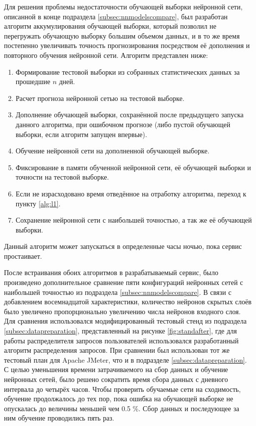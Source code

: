 \documentclass[a4paper,14pt,russian]{extreport}
\begin{document}
Для решения проблемы недостаточности обучающей выборки нейронной сети, 
описанной в конце подраздела \ref{subsec:nnmodelscompare}, был разработан 
алгоритм аккумулирования обучающей выборки, который позволил не 
перегружать обучающую выборку большим объемом данных, и в то же время 
постепенно увеличивать точность прогнозирования посредством её дополнения и 
повторного обучения нейронной сети. Алгоритм представлен ниже:
\begin{enumerate}
	\item Формирование тестовой выборки из собранных статистических 
		данных за прошедшие $n$ дней.
	\item \label{alg:l1} Расчет прогноза нейронной сетью на тестовой выборке.
	\item Дополнение обучающей выборки, сохранённой после предыдущего 
		запуска данного алгоритма, при ошибочном прогнозе (либо пустой 
		обучающей выборки, если алгоритм запущен впервые). 
	\item Обучение нейронной сети на дополненной обучающей выборке.
	\item \label{alg:l2} Фиксирование в памяти обученной нейронной сети, её 
		обучающей выборки и точности на тестовой выборке.
	\item Если не израсходовано время отведённое на отработку алгоритма, 
		переход к пункту \ref{alg:l1}.
	\item Сохранение нейронной сети с наибольшей точностью, а так же её 
		обучающей выборки.
\end{enumerate}
Данный алгоритм может запускаться в определенные часы ночью, пока сервис 
простаивает.

После встраивания обоих алгоритмов в разрабатываемый сервис, было 
произведено дополнительное сравнение пяти конфигураций нейронных сетей с 
наибольшей точностью из подраздела \ref{subsec:nnmodelscompare}. В связи с 
добавлением восемнадцатой характеристики, количество нейронов скрытых 
слоёв было увеличено пропорционально увеличению числа нейронов входного 
слоя. Для сравнения использовался модифицированный тестовый стенд из 
подраздела \ref{subsec:datapreparation}, представленный на рисунке 
\ref{fig:standafter}, где для работы распределителя запросов пользователей 
использовался разработанный алгоритм распределения запросов. При сравнении 
был использован тот же тестовый план для Apache JMeter, что и в подразделе 
\ref{subsec:datapreparation}. С целью уменьшения времени затрачиваемого на сбор 
данных и обучение нейронных сетей, было решено сократить время сбора данных 
с дневного интервала до четырёх часов. Чтобы проверить обучаемые сети на 
сходимость, обучение продолжалось до тех пор, пока ошибка на обучающей 
выборке не опускалась до величины меньшей чем 0.5 \%. Сбор данных и 
последующее за ним обучение проводились пять раз.
\end{document}
